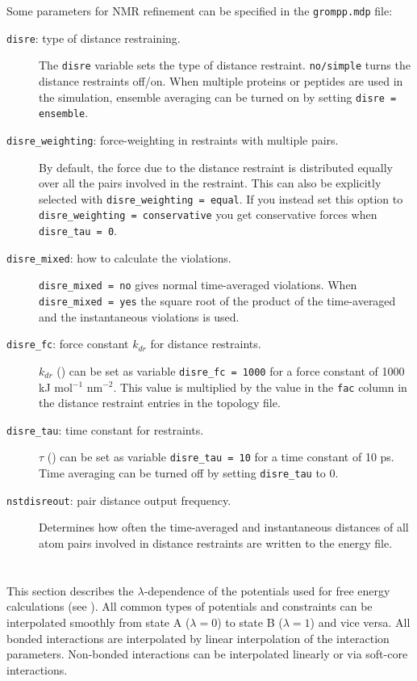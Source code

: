 Some parameters for NMR refinement can be specified in the
{\tt grompp.mdp} file:
\begin{description}
\item[{\tt disre}: type of distance restraining.]
        The {\tt disre} variable sets the type of distance restraint.
        {\tt no/simple} turns the distance restraints off/on.
        When multiple proteins or peptides are used
        in the simulation, ensemble averaging 
        can be turned on by setting {\tt disre = ensemble}.
\item[{\tt disre\_weighting}: force-weighting in restraints with
         multiple pairs.]
        By default, the force due to the distance restraint is distributed equally
        over all the pairs involved in the restraint. This can also be
        explicitly selected with
        {\tt disre\_weighting = equal}. 
        If you instead set this option to {\tt disre\_weighting = conservative}
        you get conservative forces when {\tt disre\_tau = 0}.
\item[{\tt disre\_mixed}: how to calculate the violations.]
        {\tt disre\_mixed = no} gives normal time-averaged violations.
        When {\tt disre\_mixed = yes} the square root of the
        product of the time-averaged and the instantaneous
        violations is used.
\item[{\tt disre\_fc}: force constant $k_{dr}$ for distance restraints.] 
        $k_{dr}$  () can be set
        as variable {\tt disre\_fc = 1000} for a force constant of
        1000 {kJ mol$^{-1}$ nm$^{-2}$}. This value is multiplied by
        the value in the {\tt fac} column in the distance restraint
        entries in the topology file.
\item[{\tt disre\_tau}: time constant for restraints.] 
        $\tau$ () can be set
        as variable {\tt disre\_tau = 10} for a time constant of
        10 ps. Time averaging can be turned off by setting {\tt disre\_tau}
        to 0.
\item[{\tt nstdisreout}: pair distance output frequency.]
        Determines how often the time-averaged and 
        instantaneous distances of all atom pairs involved in
        distance restraints are written to the energy file.
\end{description}

\section{}
\label{sec:feia}
\newcommand{\LAM}{\lambda}
\newcommand{\LL}{(1-\LAM)}
\newcommand{\dvdl}[1]{\frac{\partial #1}{\partial \LAM}}
This section describes the $\lambda$-dependence of the potentials
used for free energy calculations (see ).
All common types of potentials and constraints can be
interpolated smoothly from state A ($\lambda=0$) to state B
($\lambda=1$) and vice versa.
All bonded interactions are interpolated by linear interpolation
of the interaction parameters. Non-bonded interactions can be
interpolated linearly or via soft-core interactions.

